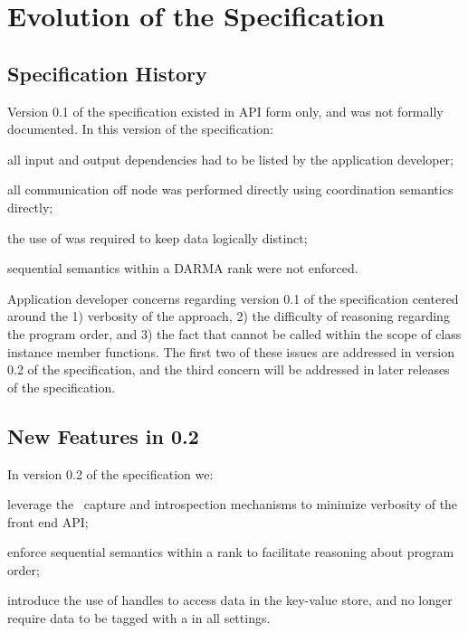 \chapter{Evolution of the Specification}
\label{chap:evolution}
\section{Specification History}
\label{sec:past}
Version 0.1 of the specification existed in \gls{API} form only, and was not
formally documented.  In this version of the specification:
\begin{compactenum}
\item all input and output dependencies had to be listed by the application
developer;
\item all communication off node was
performed directly using \gls{coordination semantics} directly;
\item  the use of  was required to keep data
logically distinct;
\item \gls{sequential semantics} within a DARMA rank were not enforced.
\end{compactenum}

 Application developer concerns regarding version 0.1 of the specification
 centered around the 1) verbosity of the approach, 2) the difficulty of
 reasoning regarding the program order, and 3) the fact that 
  cannot be called
 within the scope of class instance member functions.  The first two of these issues are
   addressed in version 0.2 of the specification, and the third concern will be
   addressed in later releases of the specification.
   


\section{New Features in 0.2}
\label{sec:current}
In version 0.2 of the specification we:
  \begin{compactenum}
\item leverage the \CC\ \gls{capture} and
    \gls{introspection} mechanisms to minimize verbosity of the \gls{front end}
    \gls{API};  
\item enforce \gls{sequential semantics} within a \gls{rank} to
    facilitate reasoning about program order; 
\item introduce the use of
    \glspl{handle} to access data in the \gls{key-value store}, and no longer
    require data to be tagged with a  in all
    settings.
    \end{compactenum}


